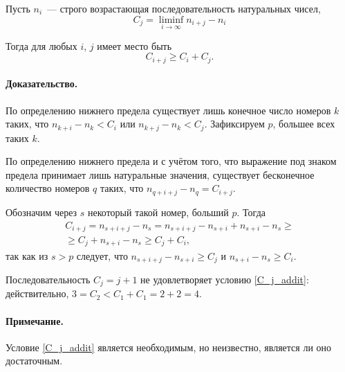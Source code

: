 
Пусть $n_i$~--- строго возрастающая последовательность натуральных чисел,
\begin{equation}
	C_j = \liminf_{i\to\infty} n_{i+j} - n_i
\end{equation}

Тогда для любых $i$, $j$ имеет место быть
\begin{equation}\label{C_j_addit}
	C_{i+j} \geq C_i + C_j
	.
\end{equation}
\paragraph{Доказательство.}
По определению нижнего предела существует лишь конечное число номеров $k$
таких, что $n_{k+i} - n_k < C_i$ или $n_{k+j} - n_k < C_j$.
Зафиксируем $p$, большее всех таких $k$.

По определению нижнего предела и с учётом того, что выражение под знаком предела
принимает лишь натуральные значения,
существует бесконечное количество номеров $q$ таких, что $n_{q+i+j} - n_q = C_{i+j}$.

Обозначим через $s$ некоторый такой номер, больший $p$.
Тогда
\begin{multline}
	C_{i+j} = n_{s+i+j} - n_s = n_{s+i+j} - n_{s+i} + n_{s+i} - n_s
	\geq \\
	\geq C_j + n_{s+i} - n_s \geq C_j + C_i,
\end{multline}
так как из $s>p$ следует, что $n_{s+i+j} - n_{s+i} \geq C_j$ и $n_{s+i} - n_s \geq C_i$.

\begin{example}
	Последовательность $C_j = j+1$ не удовлетворяет условию \eqref{C_j_addit}:
	действительно, $3=C_2 < C_1+C_1 = 2+2 = 4$.
\end{example}

\paragraph{Примечание.}
Условие \eqref{C_j_addit} является необходимым, но неизвестно, является ли оно достаточным.

